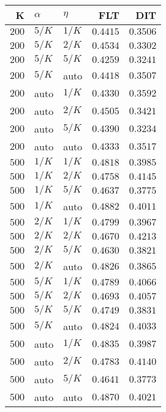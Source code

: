 \begin{table}
\begin{spacing}{1.2}
{\begin{tabular}{rll|rr}
\bottomrule
\end{tabular}
} \hfill \parbox{.45\linewidth}{\centering \begin{tabular}{rll|rr}
\toprule
    K &  $\alpha$ &    $\eta$ &           FLT &           DIT \\
\midrule
$200$ &  $5/K$ &  $1/K$ &      $0.4415$ &      $0.3506$ \\
$200$ &  $5/K$ &  $2/K$ &      $0.4534$ &      $0.3302$ \\
$200$ &  $5/K$ &  $5/K$ &      $0.4259$ &      $0.3241$ \\
$200$ &  $5/K$ &   auto &      $0.4418$ &      $0.3507$ \\
$200$ &   auto &  $1/K$ &      $0.4330$ &      $0.3592$ \\
$200$ &   auto &  $2/K$ &      $0.4505$ &      $0.3421$ \\
$200$ &   auto &  $5/K$ &      $0.4390$ &      $0.3234$ \\
$200$ &   auto &   auto &      $0.4333$ &      $0.3517$ \\
\myrowcolor $500$ &  $1/K$ &  $1/K$ &      $0.4818$ &      $0.3985$ \\
$500$ &  $1/K$ &  $2/K$ &      $0.4758$ &      $0.4145$ \\
$500$ &  $1/K$ &  $5/K$ &      $0.4637$ &      $0.3775$ \\
$500$ &  $1/K$ &   auto & $\bm{0.4882}$ &      $0.4011$ \\
$500$ &  $2/K$ &  $1/K$ &      $0.4799$ &      $0.3967$ \\
$500$ &  $2/K$ &  $2/K$ &      $0.4670$ & $\bm{0.4213}$ \\
$500$ &  $2/K$ &  $5/K$ &      $0.4630$ &      $0.3821$ \\
$500$ &  $2/K$ &   auto &      $0.4826$ &      $0.3865$ \\
$500$ &  $5/K$ &  $1/K$ &      $0.4789$ &      $0.4066$ \\
$500$ &  $5/K$ &  $2/K$ &      $0.4693$ &      $0.4057$ \\
$500$ &  $5/K$ &  $5/K$ &      $0.4749$ &      $0.3831$ \\
$500$ &  $5/K$ &   auto &      $0.4824$ &      $0.4033$ \\
$500$ &   auto &  $1/K$ &      $0.4835$ &      $0.3987$ \\
$500$ &   auto &  $2/K$ &      $0.4783$ &      $0.4140$ \\
$500$ &   auto &  $5/K$ &      $0.4641$ &      $0.3773$ \\
$500$ &   auto &   auto &      $0.4870$ &      $0.4021$ \\
\bottomrule
\end{tabular}
}
\end{spacing}
\end{table}
